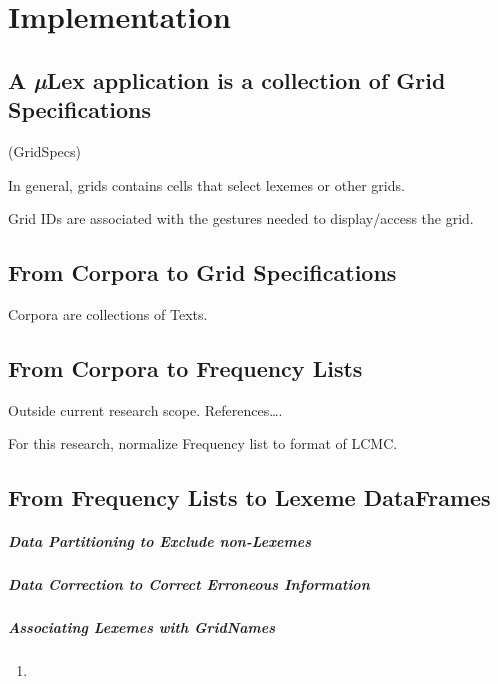 \chapter{Implementation}\label{implementation}

\section{\texorpdfstring{A \emph{\textbf{µ}}Lex application is a
collection of Grid
Specifications}{A µLex application is a collection of Grid Specifications}}\label{a-uxb5lex-application-is-a-collection-of-grid-specifications}

(GridSpecs)

In general, grids contains cells that select lexemes or other grids.

Grid IDs are associated with the gestures needed to display/access the
grid.

\section{From Corpora to Grid
Specifications}\label{from-corpora-to-grid-specifications}

Corpora are collections of Texts.

\section{From Corpora to Frequency
Lists}\label{from-corpora-to-frequency-lists}

Outside current research scope. References\ldots.

For this research, normalize Frequency list to format of LCMC.

\section{From Frequency Lists to Lexeme
DataFrames}\label{from-frequency-lists-to-lexeme-dataframes}

\paragraph{Data Partitioning to Exclude
non-Lexemes}\label{data-partitioning-to-exclude-non-lexemes}

\paragraph{Data Correction to Correct Erroneous
Information}\label{data-correction-to-correct-erroneous-information}

\paragraph{Associating Lexemes with
GridNames}\label{associating-lexemes-with-gridnames}

\begin{enumerate}
\def\labelenumi{\arabic{enumi}.}
\setcounter{enumi}{5}
\tightlist
\item
\end{enumerate}
